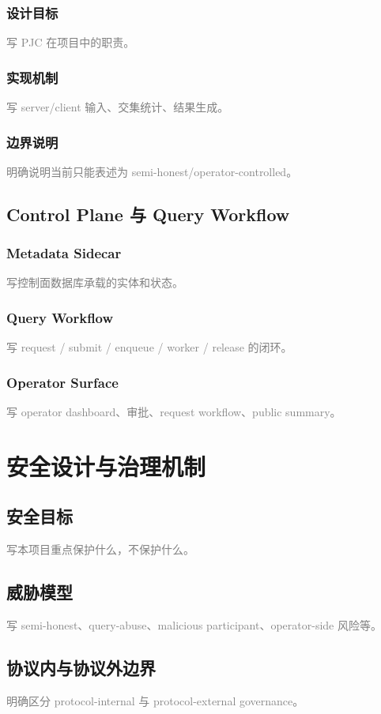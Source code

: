 \documentclass[UTF8,a4paper,12pt,oneside]{ctexrep}
\newcommand{\placeholder}[1]{\textcolor{gray}{#1}}
\begin{document}
\subsection{设计目标}
\placeholder{写 PJC 在项目中的职责。}
\subsection{实现机制}
\placeholder{写 server/client 输入、交集统计、结果生成。}
\subsection{边界说明}
\placeholder{明确说明当前只能表述为 semi-honest/operator-controlled。}

\section{Control Plane 与 Query Workflow}
\subsection{Metadata Sidecar}
\placeholder{写控制面数据库承载的实体和状态。}
\subsection{Query Workflow}
\placeholder{写 request / submit / enqueue / worker / release 的闭环。}
\subsection{Operator Surface}
\placeholder{写 operator dashboard、审批、request workflow、public summary。}

\chapter{安全设计与治理机制}

\section{安全目标}
\placeholder{写本项目重点保护什么，不保护什么。}

\section{威胁模型}
\placeholder{写 semi-honest、query-abuse、malicious participant、operator-side 风险等。}

\section{协议内与协议外边界}
\placeholder{明确区分 protocol-internal 与 protocol-external governance。}
\end{document}
